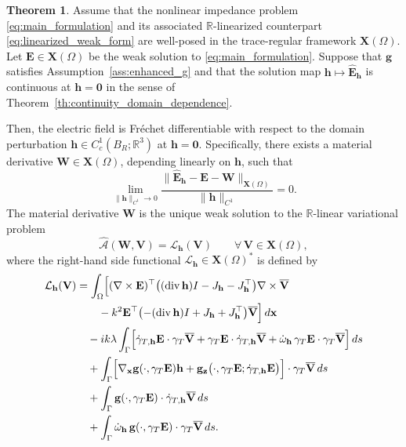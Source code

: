 \documentclass[12pt,reqno]{amsart}
\theoremstyle{definition}
\newtheorem{theo}{Theorem}[section]
\numberwithin{equation}{section}
\begin{document}
\begin{theo}\label{th:symmetrisation1}
Assume that the nonlinear impedance problem \eqref{eq:main_formulation} and its associated $\mathbb{R}$-linearized counterpart \eqref{eq:linearized_weak_form} are well-posed in the trace-regular framework $\mathbf{X}(\Omega)$. Let $\mathbf{E} \in \mathbf{X}(\Omega)$ be the weak solution to \eqref{eq:main_formulation}. Suppose that $\mathbf{g}$ satisfies Assumption~\ref{ass:enhanced_g} and that the solution map $\mathbf{h} \mapsto \hat{\mathbf{E}}_{\mathbf{h}}$ is continuous at $\mathbf{h} = \mathbf{0}$ in the sense of Theorem~\ref{th:continuity_domain_dependence}.

Then, the electric field is Fr\'{e}chet differentiable with respect to the domain perturbation $\mathbf{h} \in C_c^1(B_R; \mathbb{R}^3)$ at $\mathbf{h} = \mathbf{0}$. Specifically, there exists a material derivative $\mathbf{W} \in \mathbf{X}(\Omega)$, depending linearly on $\mathbf{h}$, such that
\begin{equation*}
\lim_{\|\mathbf{h}\|_{C^1} \to 0} \frac{\|\hat{\mathbf{E}}_{\mathbf{h}} - \mathbf{E} - \mathbf{W}\|_{\mathbf{X}(\Omega)}}{\|\mathbf{h}\|_{C^1}} = 0.
\end{equation*}
The material derivative $\mathbf{W}$ is the unique weak solution to the $\mathbb{R}$-linear variational problem
\[
\widehat{\mathcal{A}}(\mathbf{W}, \mathbf{V}) = \mathcal{L}_{\mathbf{h}}(\mathbf{V}) \qquad \forall \, \mathbf{V} \in \mathbf{X}(\Omega),
\]
where the right-hand side functional $\mathcal{L}_{\mathbf{h}} \in \mathbf{X}(\Omega)^*$ is defined by
\begin{equation}\label{eq:material_derivative}
\begin{aligned}
\mathcal L_{\mathbf h}(\mathbf V)
&=
\int_{\Omega}
\Bigl[
(\nabla\times \mathbf E)^{\top}
\bigl(
(\operatorname{div}\mathbf h)I
-
J_{\mathbf h}
-
J_{\mathbf h}^{\top}
\bigr)
\nabla\times\overline{\mathbf V}
\\
&\qquad
-
k^2\mathbf E^{\top}
\bigl(
-(\operatorname{div}\mathbf h)I
+
J_{\mathbf h}
+
J_{\mathbf h}^{\top}
\bigr)
\overline{\mathbf V}
\Bigr]\,d\mathbf x
\\
&\quad
-ik\lambda
\int_{\Gamma}
\Bigl[\dot\gamma_{T,\mathbf h}\mathbf E\cdot\gamma_T\overline{\mathbf V}+
\gamma_T\mathbf E\cdot\dot\gamma_{T,\mathbf h}\overline{\mathbf V}+
\dot\omega_{\mathbf h}\,
\gamma_T\mathbf E\cdot\gamma_T\overline{\mathbf V}
\Bigr]\,ds\\&\quad+
\int_{\Gamma}
\Bigl[
\nabla_{\mathbf x}\mathbf g(\cdot,\gamma_T\mathbf E)\mathbf h+
\mathbf g_{\mathbf z}
\bigl(\cdot,\gamma_T\mathbf E;
\dot\gamma_{T,\mathbf h}\mathbf E\bigr)\Bigr]\cdot
\gamma_T\overline{\mathbf V}\,ds
\\
&\quad+\int_{\Gamma}
\mathbf g(\cdot,\gamma_T\mathbf E)
\cdot
\dot\gamma_{T,\mathbf h}\overline{\mathbf V}\,ds\\
&\quad+
\int_{\Gamma}\dot\omega_{\mathbf h}\,
\mathbf g(\cdot,\gamma_T\mathbf E)\cdot
\gamma_T\overline{\mathbf V}\,ds .
\end{aligned}
\end{equation}

\end{theo}
\end{document}
